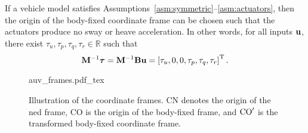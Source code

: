 \begin{prop}
    \label{prop:neutral_point}
    If a vehicle model satisfies Assumptions~\ref{asm:symmetric}--\ref{asm:actuators}, then the origin of the body-fixed coordinate frame can be chosen such that the actuators produce no sway or heave acceleration.
    In other words, for all inputs $\mathbf{u}$, there exist $\tau_u, \tau_p, \tau_q, \tau_r \in \mathbb{R}$ such that
    \begin{equation}
        \mathbf{M}^{-1}\bm{\tau} = \mathbf{M}^{-1}\mathbf{B}\mathbf{u} = \left[\tau_u, 0, 0, \tau_p, \tau_q, \tau_r\right]^{\mathrm{T}}.
        \label{eq:neutral_point_force}
    \end{equation}
\end{prop}
\begin{figure}[b]
    \centering
    \def\svgwidth{0.4\textwidth}
    {auv_frames.pdf_tex}
    \caption{Illustration of the coordinate frames. CN denotes the origin of the \gls{ned} frame, CO is the origin of the body-fixed frame, and ${\rm CO}^{\prime}$ is the transformed body-fixed coordinate frame.}
    \label{fig:background_auv_frames}
\end{figure}

